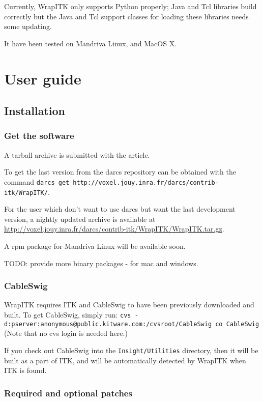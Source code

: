 \documentclass{InsightArticle}
\begin{document}
Currently, WrapITK only supports Python properly; Java and Tcl libraries build
correctly but the Java and Tcl support classes for loading these libraries needs
some updating.

It have been tested on Mandriva Linux, and MacOS X.



\section{User guide}

  \subsection{Installation}

    \subsubsection{Get the software}

A tarball archive is submitted with the article.

To get the last version from the darcs repository can be obtained
with the command 
\verb$darcs get http://voxel.jouy.inra.fr/darcs/contrib-itk/WrapITK/$.

For the user which don't want to use darcs but want the last development version,
a nightly updated archive is available at
\url{http://voxel.jouy.inra.fr/darcs/contrib-itk/WrapITK/WrapITK.tar.gz}.

A rpm package for Mandriva Linux will be available soon.

TODO: provide more binary packages - for mac and windows.

    \subsubsection{CableSwig}

WrapITK requires ITK and CableSwig to have been previously downloaded and built.
To get CableSwig, simply run:
\verb$cvs -d:pserver:anonymous@public.kitware.com:/cvsroot/CableSwig co CableSwig$
(Note that no cvs login is needed here.)

If you check out CableSwig into the \verb$Insight/Utilities$ directory, then it will be
built as a part of ITK, and will be automatically detected by WrapITK when ITK
is found.

    \subsubsection{Required and optional patches}
\end{document}
